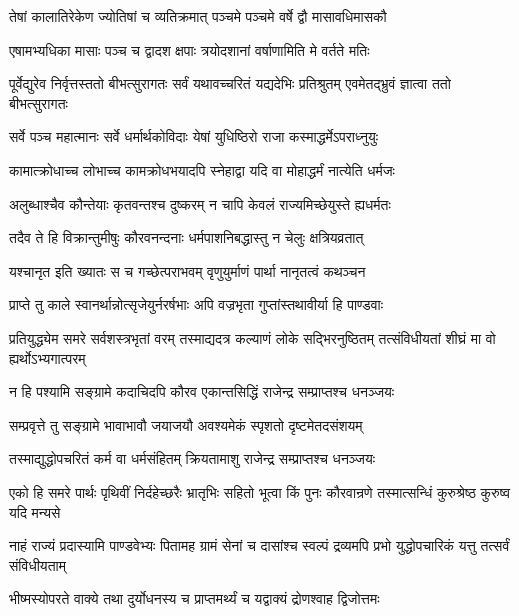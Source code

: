 \twolineshloka
{तेषां कालातिरेकेण ज्योतिषां च व्यतिक्रमात्}
{पञ्चमे पञ्चमे वर्षे द्वौ मासावधिमासकौ}


\twolineshloka
{एषामभ्यधिका मासाः पञ्च च द्वादश क्षपाः}
{त्रयोदशानां वर्षाणामिति मे वर्तते मतिः}


\onelineshloka
{पूर्वेद्युरेव निर्वृत्तस्ततो बीभत्सुरागतः}
\twolineshloka
{सर्वं यथावच्चरितं यद्यदेभिः प्रतिश्रुतम्}
{एवमेतद्भ्रुवं ज्ञात्वा ततो बीभत्सुरागतः}


\twolineshloka
{सर्वे पञ्च महात्मानः सर्वे धर्मार्थकोविदाः}
{येषां युधिष्ठिरो राजा कस्माद्धर्मेऽपराध्नुयुः}


\twolineshloka
{कामात्क्रोधाच्च लोभाच्च कामक्रोधभयादपि}
{स्नेहाद्वा यदि वा मोहाद्धर्मं नात्येति धर्मजः}


\twolineshloka
{अलुब्धाश्चैव कौन्तेयाः कृतवन्तश्च दुष्करम्}
{न चापि केवलं राज्यमिच्छेयुस्ते ह्यधर्मतः}


\twolineshloka
{तदैव ते हि विक्रान्तुमीषुः कौरवनन्दनाः}
{धर्मपाशनिबद्धास्तु न चेलुः क्षत्रियव्रतात्}


\twolineshloka
{यश्चानृत इति ख्यातः स च गच्छेत्पराभवम्}
{वृणुयुर्माणं पार्था नानृतत्वं कथञ्चन}


\twolineshloka
{प्राप्ते तु काले स्वानर्थान्नोत्सृजेयुर्नरर्षभाः}
{अपि वज्रभृता गुप्तांस्तथावीर्या हि पाण्डवाः}


\onelineshloka
{प्रतियुद्ध्येम समरे सर्वशस्त्रभृतां वरम्}
\twolineshloka
{तस्माद्यदत्र कल्याणं लोके सद्भिरनुष्ठितम्}
{तत्संविधीयतां शीघ्रं मा वो ह्यर्थोऽभ्यगात्परम्}


\twolineshloka
{न हि पश्यामि सङ्ग्रामे कदाचिदपि कौरव}
{एकान्तसिद्धिं राजेन्द्र सम्प्राप्तश्च धनञ्जयः}


\twolineshloka
{सम्प्रवृत्ते तु सङ्ग्रामे भावाभावौ जयाजयौ}
{अवश्यमेकं स्पृशतो दृष्टमेतदसंशयम्}


\twolineshloka
{तस्माद्युद्धोपचरितं कर्म वा धर्मसंहितम्}
{क्रियतामाशु राजेन्द्र सम्प्राप्तश्च धनञ्जयः}


\threelineshloka
{एको हि समरे पार्थः पृथिवीं निर्दहेच्छरैः}
{भ्रातृभिः सहितो भूत्वा किं पुनः कौरवान्रणे}
{तस्मात्सन्धिं कुरुश्रेष्ठ कुरुष्व यदि मन्यसे}




\threelineshloka
{नाहं राज्यं प्रदास्यामि पाण्डवेभ्यः पितामह}
{ग्रामं सेनां च दासांश्च स्वल्पं द्रव्यमपि प्रभो}
{युद्धोपचारिकं यत्तु तत्सर्वं संविधीयताम्}



\twolineshloka
{भीष्मस्योपरते वाक्ये तथा दुर्योधनस्य च}
{प्राप्तमर्थ्यं च यद्वाक्यं द्रोणश्वाह द्विजोत्तमः}


